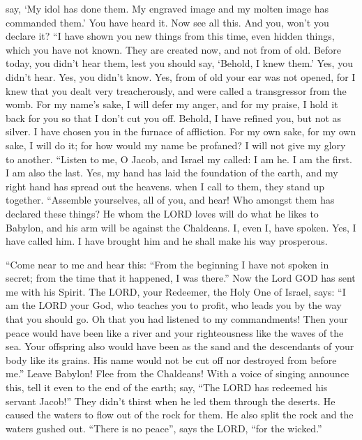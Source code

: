 say, `My idol has done them. My engraved image and my molten image has
commanded them.'  You have heard it. Now see all this. And
you, won't you declare it? ``I have shown you new things from this time,
even hidden things, which you have not known.  They are
created now, and not from of old. Before today, you didn't hear them,
lest you should say, `Behold, I knew them.'  Yes, you didn't
hear. Yes, you didn't know. Yes, from of old your ear was not opened,
for I knew that you dealt very treacherously, and were called a
transgressor from the womb.  For my name's sake, I will
defer my anger, and for my praise, I hold it back for you so that I
don't cut you off.  Behold, I have refined you, but not as
silver. I have chosen you in the furnace of affliction. 
For my own sake, for my own sake, I will do it; for how would my name be
profaned? I will not give my glory to another.  ``Listen to
me, O Jacob, and Israel my called: I am he. I am the first. I am also
the last.  Yes, my hand has laid the foundation of the
earth, and my right hand has spread out the heavens. when I call to
them, they stand up together.  ``Assemble yourselves, all
of you, and hear! Who amongst them has declared these things? He whom
the LORD loves will do what he likes to Babylon, and his arm will be
against the Chaldeans.  I, even I, have spoken. Yes, I have
called him. I have brought him and he shall make his way prosperous.

 ``Come near to me and hear this: ``From the beginning I
have not spoken in secret; from the time that it happened, I was
there.'' Now the Lord GOD has sent me with his Spirit.  The
LORD, your Redeemer, the Holy One of Israel, says: ``I am the LORD your
God, who teaches you to profit, who leads you by the way that you should
go.  Oh that you had listened to my commandments! Then your
peace would have been like a river and your righteousness like the waves
of the sea.  Your offspring also would have been as the
sand and the descendants of your body like its grains. His name would
not be cut off nor destroyed from before me.''  Leave
Babylon! Flee from the Chaldeans! With a voice of singing announce this,
tell it even to the end of the earth; say, ``The LORD has redeemed his
servant Jacob!''  They didn't thirst when he led them
through the deserts. He caused the waters to flow out of the rock for
them. He also split the rock and the waters gushed out. 
``There is no peace'', says the LORD, ``for the wicked.''

